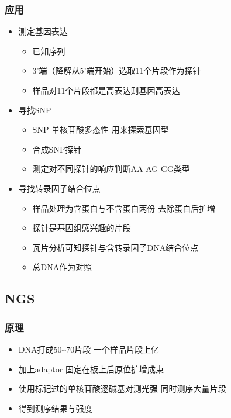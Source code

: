\documentclass[
]{book}
\providecommand{\tightlist}{%
  \setlength{\itemsep}{0pt}\setlength{\parskip}{0pt}}
\begin{document}
\hypertarget{ux5e94ux7528}{%
\subsubsection{应用}\label{ux5e94ux7528}}

\begin{itemize}
\item
  测定基因表达

  \begin{itemize}
  \tightlist
  \item
    已知序列
  \item
    3'端（降解从5'端开始）选取11个片段作为探针
  \item
    样品对11个片段都是高表达则基因高表达
  \end{itemize}
\item
  寻找SNP

  \begin{itemize}
  \tightlist
  \item
    SNP 单核苷酸多态性 用来探索基因型
  \item
    合成SNP探针
  \item
    测定对不同探针的响应判断AA AG GG类型
  \end{itemize}
\item
  寻找转录因子结合位点

  \begin{itemize}
  \tightlist
  \item
    样品处理为含蛋白与不含蛋白两份 去除蛋白后扩增
  \item
    探针是基因组感兴趣的片段
  \item
    瓦片分析可知探针与含转录因子DNA结合位点
  \item
    总DNA作为对照
  \end{itemize}
\end{itemize}

\hypertarget{ngs}{%
\subsection{NGS}\label{ngs}}

\hypertarget{ux539fux7406-1}{%
\subsubsection{原理}\label{ux539fux7406-1}}

\begin{itemize}
\tightlist
\item
  DNA打成50\textasciitilde70片段 一个样品片段上亿
\item
  加上adaptor 固定在板上后原位扩增成束
\item
  使用标记过的单核苷酸逐碱基对测光强 同时测序大量片段
\item
  得到测序结果与强度
\end{itemize}
\end{document}
